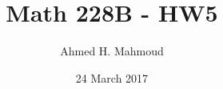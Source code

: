 \documentclass[12pt]{article}
\begin{document}
\title{Math 228B - HW5}
\author{Ahmed H. Mahmoud}
\date{24 March 2017} 

\maketitle

\newcommand{\cn}{Crank-Nicolson}
\newcommand{\lw}{Lax-Wendroff}
\newcommand{\bw}{Beam-Warming}



\newpage






\end{document}
